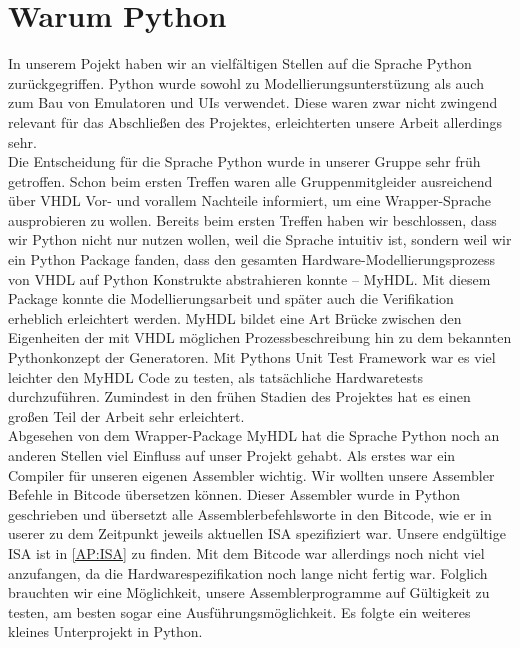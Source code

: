 \section{Warum Python}
In unserem Pojekt haben wir an vielfältigen Stellen auf die Sprache Python zurückgegriffen. Python wurde sowohl zu Modellierungsunterstüzung als auch zum Bau von Emulatoren und UIs verwendet. Diese waren zwar nicht zwingend relevant für das Abschließen des Projektes, erleichterten unsere Arbeit allerdings sehr.\\
Die Entscheidung für die Sprache Python wurde in unserer Gruppe sehr früh getroffen. Schon beim ersten Treffen waren alle Gruppenmitgleider ausreichend über VHDL Vor- und vorallem Nachteile informiert, um eine Wrapper-Sprache ausprobieren zu wollen. Bereits beim ersten Treffen haben wir beschlossen, dass wir Python nicht nur nutzen wollen, weil die Sprache intuitiv ist, sondern weil wir ein Python Package fanden, dass den gesamten Hardware-Modellierungsprozess von VHDL auf Python Konstrukte abstrahieren konnte -- MyHDL. Mit diesem Package konnte die Modellierungsarbeit und später auch die Verifikation erheblich erleichtert werden. MyHDL bildet eine Art Brücke zwischen den Eigenheiten der mit VHDL möglichen Prozessbeschreibung hin zu dem bekannten Pythonkonzept der Generatoren. Mit Pythons Unit Test Framework war es viel leichter den MyHDL Code zu testen, als tatsächliche Hardwaretests durchzuführen. Zumindest in den frühen Stadien des Projektes hat es einen großen Teil der Arbeit sehr erleichtert.\\
Abgesehen von dem Wrapper-Package MyHDL hat die Sprache Python noch an anderen Stellen viel Einfluss auf unser Projekt gehabt. Als erstes war ein Compiler für unseren eigenen Assembler wichtig. Wir wollten unsere Assembler Befehle in Bitcode übersetzen können. Dieser Assembler wurde in Python geschrieben und übersetzt alle Assemblerbefehlsworte in den Bitcode, wie er in userer zu dem Zeitpunkt jeweils aktuellen ISA spezifiziert war. Unsere endgültige ISA ist in \autoref{AP:ISA} zu finden. Mit dem Bitcode war allerdings noch nicht viel anzufangen, da die Hardwarespezifikation noch lange nicht fertig war. Folglich brauchten wir eine Möglichkeit, unsere Assemblerprogramme auf Gültigkeit zu testen, am besten sogar eine Ausführungsmöglichkeit. Es folgte ein weiteres kleines Unterprojekt in Python.\\
